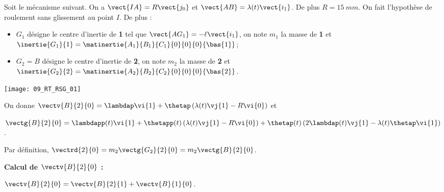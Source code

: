 \normalfalse \difficiletrue \tdifficilefalse
\correctiontrue


\setcounter{question}{0}%
\ifcorrection
\else
{}
\fi

\ifprof
\else
Soit le mécanisme suivant. On a $\vect{IA}=R\vect{j_0}$ et $\vect{AB}=\lambda(t)\vect{i_1}$. De plus $R=\SI{15}{mm}$.
On fait l'hypothèse de roulement sans glissement au point $I$. De plus :
\begin{itemize}
\item $G_1$ désigne le centre d'inertie de \textbf{1} tel que $\vect{AG_1}=-\ell\vect{i_1}$, on note $m_1$ la masse de \textbf{1} et $\inertie{G_1}{1}=\matinertie{A_1}{B_1}{C_1}{0}{0}{0}{\bas{1}}$; 
\item $G_2=B$ désigne le centre d'inertie de \textbf{2}, on note $m_2$ la masse de \textbf{2} et $\inertie{G_2}{2}=\matinertie{A_2}{B_2}{C_2}{0}{0}{0}{\bas{2}}$.
\end{itemize}
\begin{marginfigure}
\texttt{[image: 09\_RT\_RSG\_01]}
\end{marginfigure}

On donne  $\vectv{B}{2}{0} = \lambdap\vi{1} + \thetap\left(\lambda(t)\vj{1}-R\vi{0} \right)$
et

$\vectg{B}{2}{0}  = \lambdapp(t)\vi{1} %
+ \thetapp(t)\left(\lambda(t)\vj{1}-R\vi{0} \right)
+ \thetap(t)\left(2\lambdap(t)\vj{1}-\lambda(t)\thetap\vi{1} \right)
$.


\fi



\ifprof

Par définition, $\vectrd{2}{0} =  m_2 \vectg{G_2}{2}{0}=  m_2 \vectg{B}{2}{0}$.

\vspace{.5cm}

\textbf{Calcul de $ \vectv{B}{2}{0}$ :}

$\vectv{B}{2}{0}=\vectv{B}{2}{1}+\vectv{B}{1}{0}$.

